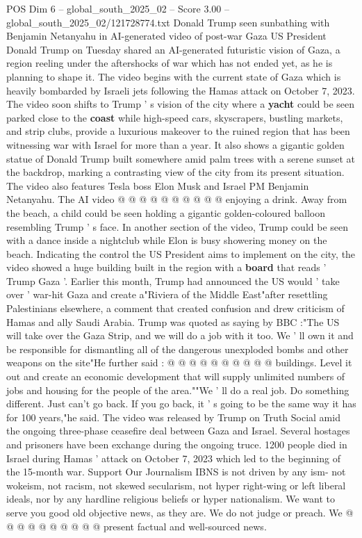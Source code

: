 \begin{textsample}{POS Dim 6 – global\_south\_2025\_02 – Score 3.00 – global\_south\_2025\_02/121728774.txt}  \label{ex:f6_pos_407}
Donald Trump seen sunbathing with Benjamin Netanyahu in AI-generated video of post-war Gaza US President Donald Trump on Tuesday shared an AI-generated futuristic vision of Gaza, a region reeling under the aftershocks of war which has not ended yet, as he is planning to shape it.
The video begins with the current state of Gaza which is heavily bombarded by Israeli jets following the Hamas attack on October 7, 2023.
The video soon shifts to Trump ' s vision of the city where a \textbf{yacht} could be seen parked close to the \textbf{coast} while high-speed cars, skyscrapers, bustling markets, and strip clubs, provide a luxurious makeover to the ruined region that has been witnessing war with Israel for more than a year.
It also shows a gigantic golden statue of Donald Trump built somewhere amid palm trees with a serene sunset at the backdrop, marking a contrasting view of the city from its present situation.
The video also features Tesla boss Elon Musk and Israel PM Benjamin Netanyahu.
The AI video @ @ @ @ @ @ @ @ @ @ enjoying a drink.
Away from the beach, a child could be seen holding a gigantic golden-coloured balloon resembling Trump ' s face.
In another section of the video, Trump could be seen with a dance inside a nightclub while Elon is busy showering money on the beach.
Indicating the control the US President aims to implement on the city, the video showed a huge building built in the region with a \textbf{board} that reads ' Trump Gaza '.
Earlier this month, Trump had announced the US would ' take over ' war-hit Gaza and create a"Riviera of the Middle East"after resettling Palestinians elsewhere, a comment that created confusion and drew criticism of Hamas and ally Saudi Arabia.
Trump was quoted as saying by BBC :"The US will take over the Gaza Strip, and we will do a job with it too.
We ' ll own it and be responsible for dismantling all of the dangerous unexploded bombs and other weapons on the site"He further said : @ @ @ @ @ @ @ @ @ @ buildings.
Level it out and create an economic development that will supply unlimited numbers of jobs and housing for the people of the area.""We ' ll do a real job.
Do something different.
Just can't go back.
If you go back, it ' s going to be the same way it has for 100 years,"he said.
The video was released by Trump on Truth Social amid the ongoing three-phase ceasefire deal between Gaza and Israel.
Several hostages and prisoners have been exchange during the ongoing truce. 1200 people died in Israel during Hamas ' attack on October 7, 2023 which led to the beginning of the 15-month war.
Support Our Journalism IBNS is not driven by any ism- not wokeism, not racism, not skewed secularism, not hyper right-wing or left liberal ideals, nor by any hardline religious beliefs or hyper nationalism.
We want to serve you good old objective news, as they are.
We do not judge or preach.
We @ @ @ @ @ @ @ @ @ @ present factual and well-sourced news.

\end{textsample}

